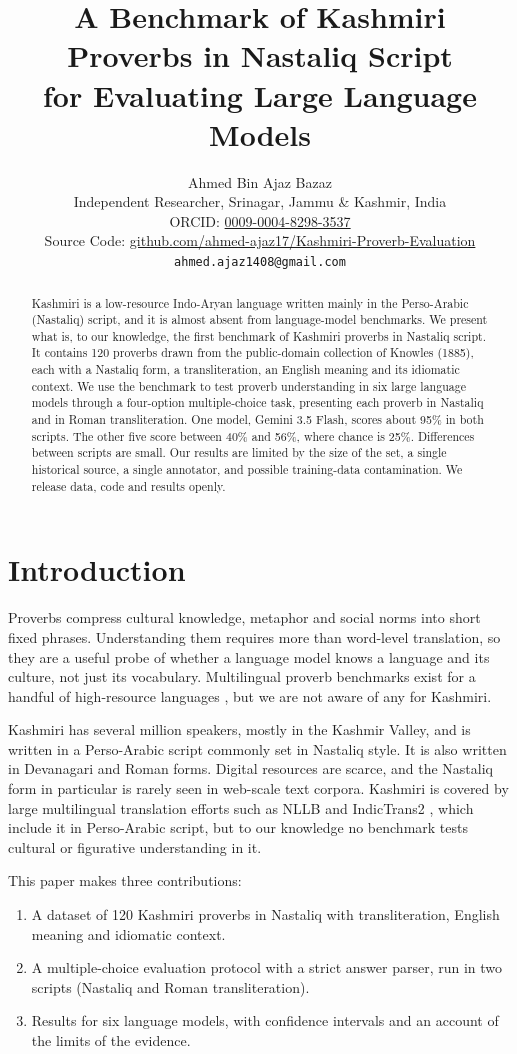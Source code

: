 \documentclass[11pt]{article}
\title{A Benchmark of Kashmiri Proverbs in Nastaliq Script\\for Evaluating Large Language Models}
\author{Ahmed Bin Ajaz Bazaz\\
Independent Researcher, Srinagar, Jammu \& Kashmir, India\\
ORCID: \href{https://orcid.org/0009-0004-8298-3537}{0009-0004-8298-3537}\\
Source Code: \href{https://github.com/ahmed-ajaz17/Kashmiri-Proverb-Evaluation}{github.com/ahmed-ajaz17/Kashmiri-Proverb-Evaluation}\\
\texttt{ahmed.ajaz1408@gmail.com}}
\date{}
\begin{document}
\maketitle

\begin{abstract}
Kashmiri is a low-resource Indo-Aryan language written mainly in the Perso-Arabic (Nastaliq) script, and it is almost absent from language-model benchmarks. We present what is, to our knowledge, the first benchmark of Kashmiri proverbs in Nastaliq script. It contains 120 proverbs drawn from the public-domain collection of Knowles (1885), each with a Nastaliq form, a transliteration, an English meaning and its idiomatic context. We use the benchmark to test proverb understanding in six large language models through a four-option multiple-choice task, presenting each proverb in Nastaliq and in Roman transliteration. One model, Gemini 3.5 Flash, scores about 95\% in both scripts. The other five score between 40\% and 56\%, where chance is 25\%. Differences between scripts are small. Our results are limited by the size of the set, a single historical source, a single annotator, and possible training-data contamination. We release data, code and results openly.
\end{abstract}

\section{Introduction}
Proverbs compress cultural knowledge, metaphor and social norms into short fixed phrases. Understanding them requires more than word-level translation, so they are a useful probe of whether a language model knows a language and its culture, not just its vocabulary. Multilingual proverb benchmarks exist for a handful of high-resource languages \cite{liu2024maps}, but we are not aware of any for Kashmiri.

Kashmiri has several million speakers, mostly in the Kashmir Valley, and is written in a Perso-Arabic script commonly set in Nastaliq style. It is also written in Devanagari and Roman forms. Digital resources are scarce, and the Nastaliq form in particular is rarely seen in web-scale text corpora. Kashmiri is covered by large multilingual translation efforts such as NLLB \cite{nllb2022} and IndicTrans2 \cite{gala2023indictrans2}, which include it in Perso-Arabic script, but to our knowledge no benchmark tests cultural or figurative understanding in it.

This paper makes three contributions:
\begin{enumerate}
\item A dataset of 120 Kashmiri proverbs in Nastaliq with transliteration, English meaning and idiomatic context.
\item A multiple-choice evaluation protocol with a strict answer parser, run in two scripts (Nastaliq and Roman transliteration).
\item Results for six language models, with confidence intervals and an account of the limits of the evidence.
\end{enumerate}
\end{document}
